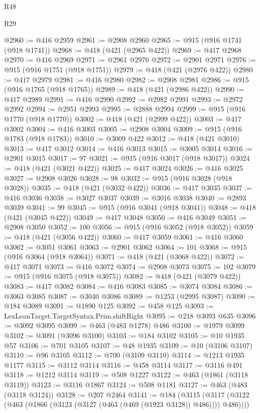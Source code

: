 \begin{lexlean}{R48}
\begin{lexlean}{R29}
\begin{coremodule}
{{{{{{{{{{{{{{{{{{{{{{{{{{{{{{{{{{{{{{{{{{{{{{{{{{{{{{{{{{{{{{{{{{{{{{{{{{{{{{{{{{{{{{{{{{{{{{{{{{{{{{{{{{{{{{{{{{{{{{{{{{{{{{{{{{{{{{{{{{{{{{{{{{{{{{{{{{{{{{{{{{{{{{{{{{{{{{{{{{{{{{{{{{{{{{{{{{{{{{{{{{{{{{{{{{{{{{{{{{@2960 := @416 @2959
@2961 := @2908 @2960
@2965 := @915 (@916 @1741 (@918 @1741))
@2968 := @418 (@421 (@2965 @422))
@2969 := @417 @2968
@2970 := @416 @2969
@2971 := @2961 @2970
@2972 := @2901 @2971
@2976 := @915 (@916 @1751 (@918 @1751))
@2979 := @418 (@421 (@2976 @422))
@2980 := @417 @2979
@2981 := @416 @2980
@2982 := @2908 @2981
@2986 := @915 (@916 @1765 (@918 @1765))
@2989 := @418 (@421 (@2986 @422))
@2990 := @417 @2989
@2991 := @416 @2990
@2992 := @2982 @2991
@2993 := @2972 @2992
@2994 := @2951 @2993
@2995 := @2888 @2994
@2999 := @915 (@916 @1770 (@918 @1770))
@3002 := @418 (@421 (@2999 @422))
@3003 := @417 @3002
@3004 := @416 @3003
@3005 := @2908 @3004
@3009 := @915 (@916 @1783 (@918 @1783))
@3010 := @3009 @422
@3012 := @418 (@421 @3010)
@3013 := @417 @3012
@3014 := @416 @3013
@3015 := @3005 @3014
@3016 := @2901 @3015
@3017 := 97
@3021 := @915 (@916 @3017 (@918 @3017))
@3024 := @418 (@421 (@3021 @422))
@3025 := @417 @3024
@3026 := @416 @3025
@3027 := @2908 @3026
@3028 := 98
@3032 := @915 (@916 @3028 (@918 @3028))
@3035 := @418 (@421 (@3032 @422))
@3036 := @417 @3035
@3037 := @416 @3036
@3038 := @3027 @3037
@3039 := @3016 @3038
@3040 := @2893 @3039
@3041 := 99
@3045 := @915 (@916 @3041 (@918 @3041))
@3048 := @418 (@421 (@3045 @422))
@3049 := @417 @3048
@3050 := @416 @3049
@3051 := @2908 @3050
@3052 := 100
@3056 := @915 (@916 @3052 (@918 @3052))
@3059 := @418 (@421 (@3056 @422))
@3060 := @417 @3059
@3061 := @416 @3060
@3062 := @3051 @3061
@3063 := @2901 @3062
@3064 := 101
@3068 := @915 (@916 @3064 (@918 @3064))
@3071 := @418 (@421 (@3068 @422))
@3072 := @417 @3071
@3073 := @416 @3072
@3074 := @2908 @3073
@3075 := 102
@3079 := @915 (@916 @3075 (@918 @3075))
@3082 := @418 (@421 (@3079 @422))
@3083 := @417 @3082
@3084 := @416 @3083
@3085 := @3074 @3084
@3086 := @3063 @3085
@3087 := @3040 @3086
@3089 := @1253 (@2995 @3087)
@3090 := @184 @3089
@3091 := @1890 @125
@3092 := @458 @125
@3093 := LexLeanTarget.TargetSyntax.Prim.shiftRight
@3095 := @218 @3093 @635
@3096 := @3092 @3095
@3099 := @463 (@483 @1278) @486
@3100 := @1979 @3099
@3102 := @3091 (@3096 @3100)
@3103 := @184 @3102
@3105 := @10 @1935 @57
@3106 := @701 @3105
@3107 := @48 @1935
@3109 := @10 (@3106 @3107)
@3110 := @96 @3105
@3112 := @700 (@3109 @3110)
@3114 := @1213 @1935 @1177
@3115 := @3112 @3114
@3116 := @458 @3114
@3117 := @3116 @491
@3118 := @1212 @3114
@3119 := @508 @1227
@3122 := @463 (@1861 (@3118 @3119))
@3123 := @3116 @1867
@3124 := @508 @1181
@3127 := @463 (@483 (@3118 @3124))
@3128 := @207 @2464
@3141 := @184
    (@3115 (@3117 (@3122 (@463 (@1866 (@3123 (@3127 (@463 (@469 (@1923 @3128)) @486)))) @486))))
}}}}}}}}}}}}}}}}}}}}}}}}}}}}}}}}}}}}}}}}}}}}}}}}}}}}}}}}}}}}}}}}}}}}}}}}}}}}}}}}}}}}}}}}}}}}}}}}}}}}}}}}}}}}}}}}}}}}}}}}}}}}}}}}}}}}}}}}}}}}}}}}}}}}}}}}}}}}}}}}}}}}}}}}}}}}}}}}}}}}}}}}}}}}}}}}}}}}}}}}}}}}}}}}}}}}}}}}}}
\end{coremodule}
\end{lexlean}
\end{lexlean}
